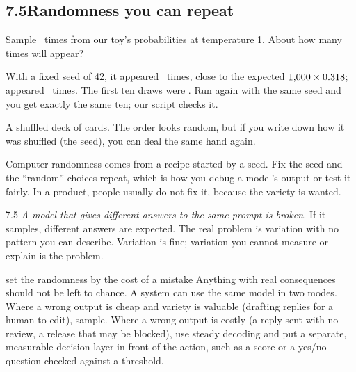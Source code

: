 
\subsection*{7.5\quad Randomness you can repeat}

\Predict Sample \nSevenN\ times from our toy's probabilities at temperature 1. About how many times will
 appear?

\Sanity With a fixed seed of 42, it appeared \nSevenSampSorry\ times, close to the expected
$1{,}000\times0.318$; \tok{\nSevenSecond} appeared \nSevenSampSecond\ times. The first ten draws were
\nSevenFirstTen. Run again with the same seed and you get exactly the same ten; our script checks it.

\Picture A shuffled deck of cards. The order looks random, but if you write down how it was shuffled (the seed), you
can deal the same hand again.

\Why Computer randomness comes from a recipe started by a seed. Fix the seed and the ``random'' choices repeat,
which is how you debug a model's output or test it fairly. In a product, people usually do not fix it, because the
variety is wanted.

\begin{wrongidea}{7.5}
\emph{A model that gives different answers to the same prompt is broken.} If it samples, different answers are
expected. The real problem is variation with no pattern you can describe. Variation is fine; variation you cannot measure or explain is the problem.
\end{wrongidea}

\begin{principle}{set the randomness by the cost of a mistake}
Anything with real consequences should not be left to chance. A system can use the same model in two modes. Where a wrong output is cheap and variety is
valuable (drafting replies for a human to edit), sample. Where a wrong output is costly (a reply sent with no
review, a release that may be blocked), use steady decoding and put a separate, measurable decision layer in front
of the action, such as a score or a yes/no question checked against a threshold.
\end{principle}


